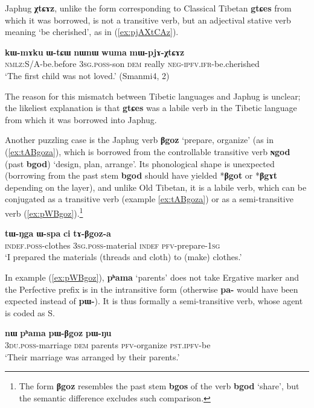 \documentclass[oneside,a4paper,11pt]{article}
\newcommand{\ipa}[1]{{\phon\textbf{\mbox{#1}}}} %
\newcommand{\refb}[1]{(\ref{#1})}
\begin{document}
Japhug \ipa{χtɕɤz}, unlike the form corresponding to Classical Tibetan \ipa{gtɕes} from which it was borrowed, is not a transitive verb, but an adjectival stative verb meaning `be cherished', as in \refb{ex:pjAXtCAz}. 

\begin{exe}
\ex \label{ex:pjAXtCAz}
\gll
\ipa{kɯ-mɤku} 	\ipa{ɯ-tɕɯ} 	\ipa{nɯnɯ} 	\ipa{wuma} 	\ipa{mɯ-pjɤ-χtɕɤz} \\
\textsc{nmlz}:S/A-be.before \textsc{3sg.poss}-son \textsc{dem} really \textsc{neg-ipfv.ifr}-be.cherished \\
\glt `The first child was not loved.' (Smanmi4, 2)
\end{exe}

The reason for this mismatch between Tibetic languages and Japhug is unclear; the likeliest explanation is that \ipa{gtɕes} was a labile verb in the Tibetic language from which it was borrowed into Japhug.


Another puzzling case is the Japhug verb \ipa{βgoz} `prepare, organize' (as in \refb{ex:tABgoza}, which is borrowed from the controllable transitive verb \ipa{ɴgod} (past \ipa{bgod}) `design, plan, arrange'. Its phonological shape is unexpected (borrowing from the past stem \ipa{bgod} should have yielded *\ipa{βgot} or *\ipa{βgɤt} depending on the layer), and unlike Old Tibetan, it is a labile verb, which can be conjugated as a transitive verb (example \ref{ex:tABgoza}) or as a semi-transitive verb (\ref{ex:pWBgoz}).\footnote{The form \ipa{βgoz} resembles the past stem \ipa{bgos} of the verb \ipa{bgod} `share', but the semantic difference excludes such comparison.} 



\begin{exe}
\ex \label{ex:tABgoza}
\gll
\ipa{tɯ-ŋga} 	\ipa{ɯ-spa} 	\ipa{ci} 	\ipa{tɤ-βgoz-a} \\
\textsc{indef.poss}-clothes \textsc{3sg.poss}-material \textsc{indef} \textsc{pfv}-prepare-\textsc{1sg} \\
\glt `I prepared the materials (threads and cloth) to (make) clothes.'
\end{exe}

In example \refb{ex:pWBgoz},  \ipa{pʰama} `parents' does not take Ergative marker and the Perfective prefix is in the intransitive form (otherwise \ipa{pa-} would have been expected instead of \ipa{pɯ-}). It is thus formally a semi-transitive verb, whose agent is coded as S.

\begin{exe}
\ex \label{ex:pWBgoz}
\gll \ipa{ndʑi-stɯnmɯ} 	\ipa{nɯ} 	\ipa{pʰama} 	\ipa{pɯ-βgoz} 	\ipa{pɯ-ŋu} \\
\textsc{3du.poss}-marriage \textsc{dem} parents \textsc{pfv}-organize \textsc{pst.ipfv}-be \\
\glt `Their marriage was arranged by their parents.'
\end{exe}
\end{document}
